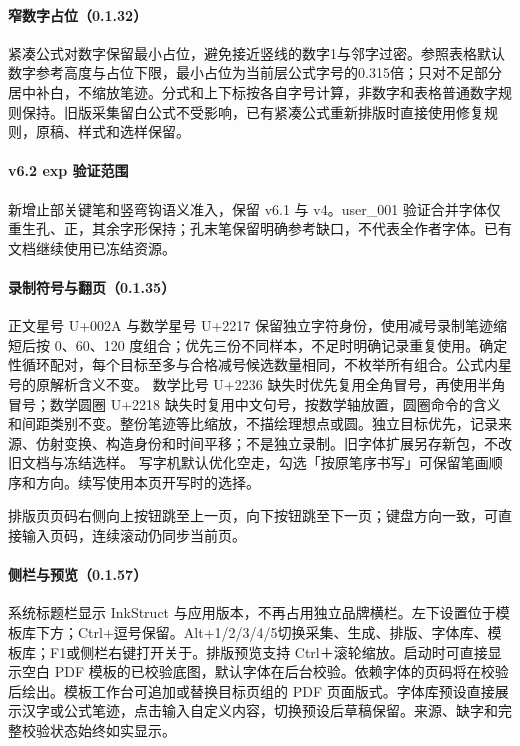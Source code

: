 \paragraph{窄数字占位（0.1.32）}紧凑公式对数字保留最小占位，避免接近竖线的数字1与邻字过密。参照表格默认数字参考高度与占位下限，最小占位为当前层公式字号的0.315倍；只对不足部分居中补白，不缩放笔迹。分式和上下标按各自字号计算，非数字和表格普通数字规则保持。旧版采集留白公式不受影响，已有紧凑公式重新排版时直接使用修复规则，原稿、样式和选样保留。

\paragraph{v6.2 exp 验证范围}新增止部关键笔和竖弯钩语义准入，保留 v6.1 与 v4。user\_001 验证合并字体仅重生孔、正，其余字形保持；孔末笔保留明确参考缺口，不代表全作者字体。已有文档继续使用已冻结资源。


\paragraph{录制符号与翻页（0.1.35）}正文星号 U+002A 与数学星号 U+2217 保留独立字符身份，使用减号录制笔迹缩短后按 0、60、120 度组合；优先三份不同样本，不足时明确记录重复使用。确定性循环配对，每个目标至多与合格减号候选数量相同，不枚举所有组合。公式内星号的原解析含义不变。
数学比号 U+2236 缺失时优先复用全角冒号，再使用半角冒号；数学圆圈 U+2218 缺失时复用中文句号，按数学轴放置，圆圈命令的含义和间距类别不变。整份笔迹等比缩放，不描绘理想点或圆。独立目标优先，记录来源、仿射变换、构造身份和时间平移；不是独立录制。旧字体扩展另存新包，不改旧文档与冻结选样。
写字机默认优化空走，勾选「按原笔序书写」可保留笔画顺序和方向。续写使用本页开写时的选择。

排版页页码右侧向上按钮跳至上一页，向下按钮跳至下一页；键盘方向一致，可直接输入页码，连续滚动仍同步当前页。

\paragraph{侧栏与预览（0.1.57）}系统标题栏显示 InkStruct 与应用版本，不再占用独立品牌横栏。左下设置位于模板库下方；Ctrl+逗号保留。Alt+1/2/3/4/5切换采集、生成、排版、字体库、模板库；F1或侧栏右键打开关于。排版预览支持 Ctrl＋滚轮缩放。启动时可直接显示空白 PDF 模板的已校验底图，默认字体在后台校验。依赖字体的页码将在校验后绘出。模板工作台可追加或替换目标页组的 PDF 页面版式。字体库预设直接展示汉字或公式笔迹，点击输入自定义内容，切换预设后草稿保留。来源、缺字和完整校验状态始终如实显示。

